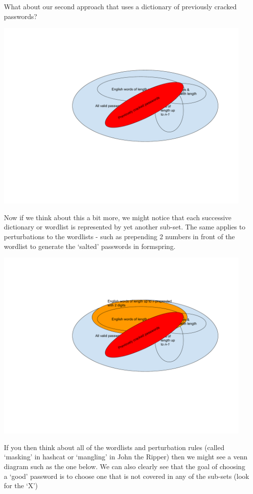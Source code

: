 What about our second approach that uses a dictionary of previously cracked passwords?

\includegraphics[width=5in]{Assignments/images/PasswordCracking_5}

Now if we think about this a bit more, we might notice that each successive dictionary or wordlist is represented by yet another sub-set. The same applies to perturbations to the wordlists - such as prepending 2 numbers in front of the wordlist to generate the ‘salted’ passwords in formspring.

\includegraphics[width=5in]{Assignments/images/PasswordCracking_6}

If you then think about all of the wordlists and perturbation rules (called ‘masking’ in hashcat or ‘mangling’ in John the Ripper) then we might see a venn diagram such as the one below. We can also clearly see that the goal of choosing a ‘good’ password is to choose one that is not covered in any of the sub-sets (look for the ‘X’)

